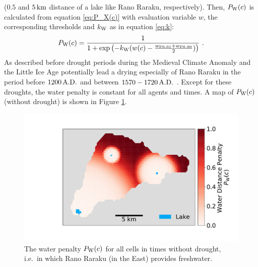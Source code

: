 ($0.5$ and $5\, {\rm km}$ distance of a lake like Rano Raraku, respectively).
Then, $P_{\rm W}(c)$ is calculated from equation \ref{eq:P_X(c)} with evaluation variable $w$, the corresponding thresholds and $k_{\rm W}$ as in equation \ref{eq:k}:
\begin{equation}
	P_{\rm W}(c) = \frac{1}{1+\exp\left( - k_{\rm W} (w(c)-\frac{w_{\rm P0.01}+w_{\rm P0.99}}{2}) \right)} \ .
\end{equation}
As described before drought periods during the Medieval Climate Anomaly and the Little Ice Age potentially lead a drying especially of Rano Raraku in the period before $1200\, {\rm A.D.}$ and between $1570-1720 \, {\rm A.D.}$ \citep{Rull2020}. 
Except for these droughts, the water penalty is constant for all agents and times.
A map of $P_{\rm W}(c)$ (without drought) is shown in Figure \ref{fig:plotpw}. 
\begin{figure}
	\centering
	\includegraphics[width=1\linewidth]{images/Plot_PW}
	\caption{The water penalty $P_{\rm W}(c)$ for all cells in times without drought, i.e.\ in which Rano Raraku (in the East) provides freshwater.}
	\label{fig:plotpw}
\end{figure}


